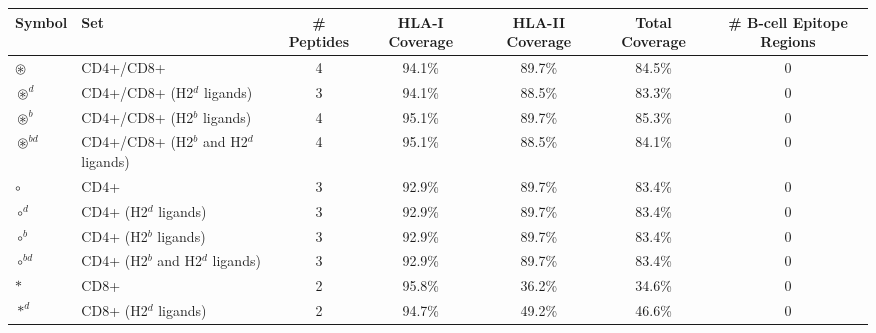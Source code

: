\begin{tabular}{llccccc}
\toprule
                                              Symbol &                                      Set &  \# Peptides & HLA-I Coverage & HLA-II Coverage & Total Coverage &  \# B-cell Epitope Regions \\
\midrule
                                     $ \circledast $ &                                CD4+/CD8+ &            4 &         94.1\% &          89.7\% &         84.5\% &                          0 \\
                                   $ \circledast^d $ &               CD4+/CD8+ (H2$^d$ ligands) &            3 &         94.1\% &          88.5\% &         83.3\% &                          0 \\
                                   $ \circledast^b $ &               CD4+/CD8+ (H2$^b$ ligands) &            4 &         95.1\% &          89.7\% &         85.3\% &                          0 \\
                                $ \circledast^{bd} $ &    CD4+/CD8+ (H2$^b$ and H2$^d$ ligands) &            4 &         95.1\% &          88.5\% &         84.1\% &                          0 \\
                                           $ \circ $ &                                     CD4+ &            3 &         92.9\% &          89.7\% &         83.4\% &                          0 \\
                                         $ \circ^d $ &                    CD4+ (H2$^d$ ligands) &            3 &         92.9\% &          89.7\% &         83.4\% &                          0 \\
                                         $ \circ^b $ &                    CD4+ (H2$^b$ ligands) &            3 &         92.9\% &          89.7\% &         83.4\% &                          0 \\
                                      $ \circ^{bd} $ &         CD4+ (H2$^b$ and H2$^d$ ligands) &            3 &         92.9\% &          89.7\% &         83.4\% &                          0 \\
                                            $ \ast $ &                                     CD8+ &            2 &         95.8\% &          36.2\% &         34.6\% &                          0 \\
                                          $ \ast^d $ &                    CD8+ (H2$^d$ ligands) &            2 &         94.7\% &          49.2\% &         46.6\% &                          0 \\

\end{tabular}
